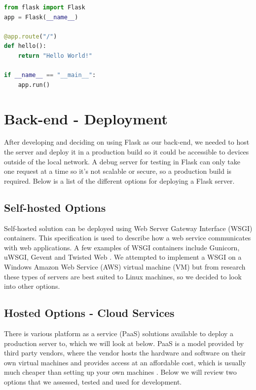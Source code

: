 \begin{lstlisting}[language=PYTHON]
from flask import Flask
app = Flask(__name__)

@app.route("/")
def hello():
    return "Hello World!"

if __name__ == "__main__":
    app.run()

\end{lstlisting}

\section{Back-end - Deployment}
After developing and deciding on using Flask as our back-end, we needed to host the server and deploy it in a production build so it could be accessible to devices outside of the local network. A debug server for testing in Flask can only take one request at a time so it's not scalable or secure, so a production build is required. Below is a list of the different options for deploying a Flask server.

\subsection{Self-hosted Options}
Self-hosted solution can be deployed using Web Server Gateway Interface (WSGI) containers. This specification is used to describe how a web service communicates with web applications. A few examples of WSGI containers include Gunicorn, uWSGI, Gevent and Twisted Web \cite{wsgi}. We attempted to implement a WSGI on a Windows Amazon Web Service (AWS) virtual machine (VM) but from research these types of servers are best suited to Linux machines, so we decided to look into other options.

\subsection{Hosted Options - Cloud Services}
There is various platform as a service (PaaS) solutions available to deploy a production server to, which we will look at below. PaaS is a model provided by third party vendors, where the vendor hosts the hardware and software on their own virtual machines and provides access at an affordable cost, which is usually much cheaper than setting up your own machines \cite{heroku}. Below we will review two options that we assessed, tested and used for development.

